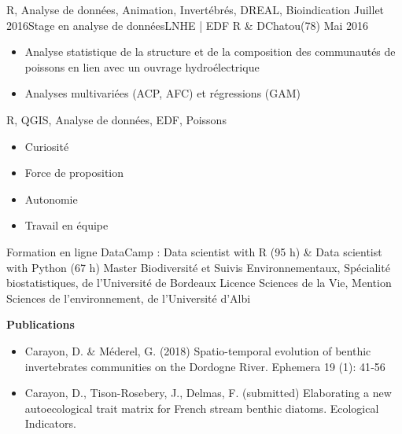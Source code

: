 \documentclass[localFont,alternative]{yaac-another-awesome-cv}
\begin{document}
\begin{experiences}
{\begin{itemize}
                      \end{itemize}
                    }
                    {R, Analyse de données, Animation, Invertébrés, DREAL, Bioindication}
  \emptySeparator
  \experience
    {Juillet 2016}{Stage en analyse de données}{LNHE | EDF R \& D}{Chatou(78)}
    {Mai 2016}    {
                      \begin{itemize}
                        \item Analyse statistique de la structure et de la composition des communautés de poissons en lien avec un ouvrage hydroélectrique
                        \item Analyses multivariées (ACP, AFC) et régressions (GAM)         
                      \end{itemize}
                    }
                    {R, QGIS,  Analyse de données, EDF, Poissons}
  \emptySeparator
  
\end{experiences}

\twocolumnsection
{
\begin{skills}
\end{skills}}
{
\vspace{1em}
\begin{itemize}
	\item Curiosité
	\item Force de proposition   
	\item Autonomie                 
    \item Travail en équipe 
\end{itemize}
}


\begin{scholarship}

					{Formation en ligne DataCamp : Data scientist with R (95 h) \& Data scientist with Python (67 h)}
					{Master Biodiversité et Suivis Environnementaux, Spécialité biostatistiques, de l'Université de Bordeaux}
					{Licence Sciences de la Vie, Mention Sciences de l'environnement, de l'Université d'Albi}
\end{scholarship}


\textbf{Publications}
\begin{itemize}
\item Carayon, D. \& Méderel, G. (2018) Spatio-temporal evolution of benthic invertebrates communities on the Dordogne River. Ephemera 19 (1): 41‑56
\item Carayon, D., Tison-Rosebery, J., Delmas, F. (submitted) Elaborating a new autoecological trait matrix for French stream benthic diatoms. Ecological Indicators.

\end{itemize}
\end{document}
